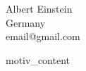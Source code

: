 \documentclass[a4paper,12pt]{letter}
\begin{document}
\begin{letter}{Albert Einstein\\
Germany\\
email@gmail.com}

\opening{}

{{motiv_content}}


\end{letter}
\end{document}
